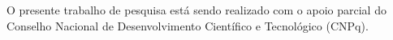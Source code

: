 \documentclass[dissertacao]{lib/ppgccufscar}
\begin{document}
\capa
\folhaderosto


\begin{agradecimentos}

O presente trabalho de pesquisa está sendo realizado com o apoio parcial do
Conselho Nacional de Desenvolvimento Científico e Tecnológico (CNPq).


\end{agradecimentos}




\listoffigures


\tableofcontents

\end{document}
